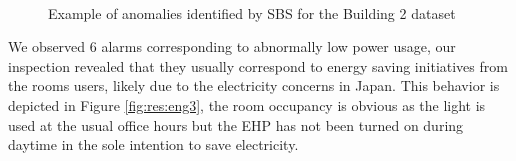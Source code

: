 \begin{figure}[t]
   \hspace{.015\textwidth}
 \hspace{.015\textwidth}
 \\ 
\caption{Example of anomalies identified by SBS for the Building 2 dataset}
\end{figure}

We observed 6 alarms corresponding to abnormally low power usage, our inspection revealed that they usually correspond to energy saving initiatives from the rooms users, likely due to the electricity concerns in Japan.
This behavior is depicted in Figure \ref{fig:res:eng3}, the room occupancy is obvious as the light is used at the usual office hours but the EHP has not been turned on during daytime in the sole intention to save electricity.

